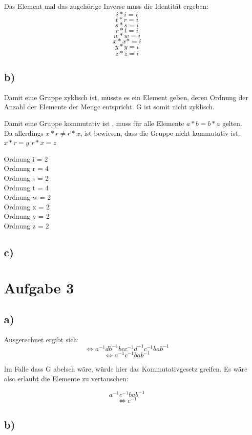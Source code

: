 \documentclass{article}
\begin{document}
	Das Element mal das zugehörige Inverse muss die Identität ergeben:
	\[i*i=i\]
	\[t*r=i \]
	\[ s*s=i\]
	\[r*t=i \]
	\[w*w=i \]
	\[x*x*=i \]
	\[y*y=i \]
	\[z*z=i \]

	\subsection*{b)}

	Damit eine Gruppe zyklisch ist, müsste es ein Element geben, deren Ordnung der Anzahl der Elemente der Menge entspricht. G ist somit nicht zyklisch. 

	Damit eine Gruppe kommutativ ist , muss für alle Elemente $a*b=b*a$ gelten. 
	Da allerdings $x*r\neq r*x$, ist bewiesen, dass die Gruppe nicht kommutativ ist.
	$x*r=y$
	$r*x=z$


	Ordnung i = 2\\
	Ordnung r = 4\\
	Ordnung s = 2\\
	Ordnung t = 4\\
	Ordnung w = 2\\
	Ordnung x = 2\\
	Ordnung y = 2\\
	Ordnung z = 2\\


	\subsection*{c)}



\section*{Aufgabe 3}

	\subsection*{a)}

	Ausgerechnet ergibt sich:
	\[\Leftrightarrow a^{-1}db^{-1}bcc^{-1}d^{-1}c^{-1}bab^{-1}\]
	\[\Leftrightarrow a^{-1}c^{-1}bab^{-1}\]

	Im Falle dass G abelsch wäre, würde hier das Kommutativgesetz greifen. Es wäre also erlaubt die Elemente zu vertauschen:

	\[ a^{-1}c^{-1}bab^{-1} \]
	\[\Leftrightarrow c^{-1}\]

	\subsection*{b)}
\end{document}
